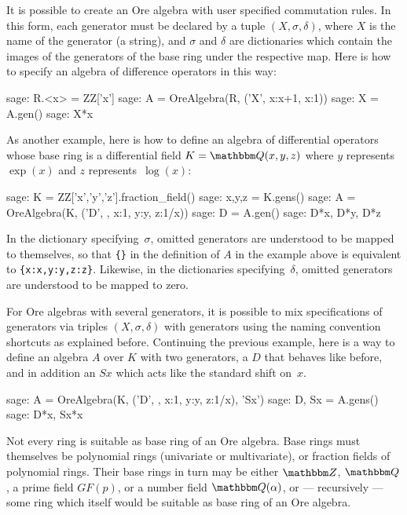 \documentclass{amsart}
\let\set\mathbbm
\begin{document}
It is possible to create an Ore algebra with user specified commutation rules.
In this form, each generator must be declared by a tuple $(X,\sigma,\delta)$, 
where $X$ is the name of the generator (a string), and $\sigma$ and $\delta$
are dictionaries which contain the images of the generators of the base
ring under the respective map. Here is how to specify an algebra of difference
operators in this way:

\begin{sageexample}
  sage: R.<x> = ZZ['x']
  sage: A = OreAlgebra(R, ('X', {x:x+1}, {x:1}))
  sage: X = A.gen()
  sage: X*x
\end{sageexample}

As another example, here is how to define an algebra of differential operators 
whose base ring is a differential field $K=\set Q(x,y,z)$ where $y$ represents
$\exp(x)$ and $z$ represents~$\log(x)$:

\begin{sageexample}
  sage: K = ZZ['x','y','z'].fraction_field()
  sage: x,y,z = K.gens()
  sage: A = OreAlgebra(K, ('D', {}, {x:1, y:y, z:1/x}))
  sage: D = A.gen()
  sage: D*x, D*y, D*z
\end{sageexample}

In the dictionary specifying~$\sigma$, omitted generators are understood to be
mapped to themselves, so that \verb|{}| in the definition of $A$ in the example
above is equivalent to \verb|{x:x,y:y,z:z}|.  Likewise, in the dictionaries
specifying~$\delta$, omitted generators are understood to be mapped to zero.

For Ore algebras with several generators, it is possible to mix specifications
of generators via triples $(X,\sigma,\delta)$ with generators using the naming
convention shortcuts as explained before. Continuing the previous example,
here is a way to define an algebra $A$ over $K$ with two generators, a $D$ 
that behaves like before, and in addition an $Sx$ which acts like the standard
shift on~$x$.

\begin{sageexample}
  sage: A = OreAlgebra(K, ('D', {}, {x:1, y:y, z:1/x}), 'Sx')
  sage: D, Sx = A.gens()
  sage: D*x, Sx*x
\end{sageexample}

Not every ring is suitable as base ring of an Ore algebra. Base rings must
themselves be polynomial rings (univariate or multivariate), or fraction 
fields of polynomial rings. Their base rings in turn may be either $\set Z$,
$\set Q$, a prime field $GF(p)$, or a number field $\set Q(\alpha)$, or
--- recursively --- some ring which itself would be suitable as base ring
of an Ore algebra. 
\end{document}
